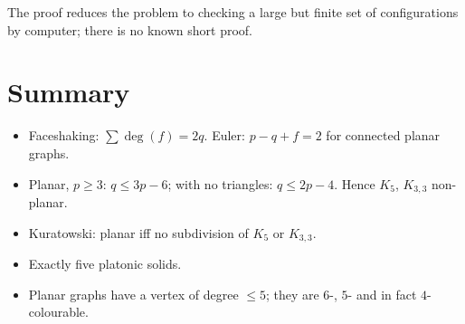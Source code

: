 The proof reduces the problem to checking a large but finite set of configurations by computer;
there is no known short proof.

\section{Summary}
\begin{itemize}
  \item Faceshaking: $\sum\deg(f) = 2q$. Euler: $p - q + f = 2$ for connected planar graphs.
  \item Planar, $p\ge3$: $q \le 3p - 6$; with no triangles: $q\le 2p-4$. Hence $K_5$, $K_{3,3}$
        non-planar.
  \item Kuratowski: planar iff no subdivision of $K_5$ or $K_{3,3}$.
  \item Exactly five platonic solids.
  \item Planar graphs have a vertex of degree $\le 5$; they are $6$-, $5$- and in fact $4$-colourable.
\end{itemize}
